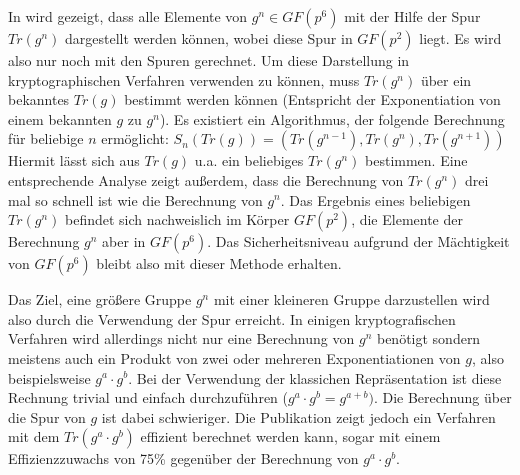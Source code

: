 \documentclass[10pt,        %
               a4paper,     %
               journal,     %
               ]{IEEEtran}
\begin{document}
In \cite{xtr-explanation} wird gezeigt, dass alle Elemente von $g^n \in GF(p^6)$ mit der Hilfe der Spur $Tr(g^n)$ dargestellt werden können, wobei diese Spur in $GF(p^2)$ liegt. Es wird also nur noch mit den Spuren gerechnet. Um diese Darstellung in kryptographischen Verfahren verwenden zu können, muss $Tr(g^n)$ über ein bekanntes $Tr(g)$ bestimmt werden können (Entspricht der Exponentiation von einem bekannten $g$ zu $g^n$). Es existiert ein Algorithmus, der folgende Berechnung für beliebige $n$ ermöglicht:\newline
$S_n(Tr(g)) = (Tr(g^{n-1}), Tr(g^n),  Tr(g^{n+1}))$\newline
Hiermit lässt sich aus $Tr(g)$ u.a. ein beliebiges $Tr(g^n)$ bestimmen. Eine entsprechende Analyse zeigt außerdem, dass die Berechnung von $Tr(g^n)$ drei mal so schnell ist wie die Berechnung von $g^n$. Das Ergebnis eines beliebigen $Tr(g^n)$ befindet sich nachweislich im Körper $GF(p^2)$, die Elemente der Berechnung $g^n$ aber in $GF(p^6)$. Das Sicherheitsniveau aufgrund der Mächtigkeit von $GF(p^6)$ bleibt also mit dieser Methode erhalten.

Das Ziel, eine größere Gruppe $g^n$ mit einer kleineren Gruppe darzustellen wird also durch die Verwendung der Spur erreicht. 
In einigen kryptografischen Verfahren wird allerdings nicht nur eine Berechnung von $g^n$ benötigt sondern meistens auch ein Produkt von zwei oder mehreren Exponentiationen von $g$, also beispielsweise $g^a \cdot g^b$. Bei der Verwendung der klassichen Repräsentation ist diese Rechnung trivial und einfach durchzuführen ($g^a \cdot g^b = g^{a+b})$. Die Berechnung über die Spur von $g$ ist dabei schwieriger. Die Publikation \cite{xtr-explanation} zeigt jedoch ein Verfahren mit dem $Tr(g^a \cdot g^b)$ effizient berechnet werden kann, sogar mit einem Effizienzzuwachs von 75\% gegenüber der Berechnung von $g^a \cdot g^b$. 
\end{document}
